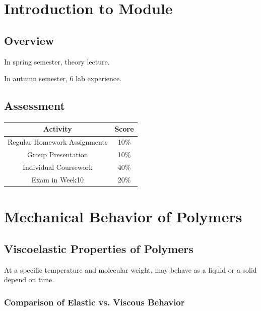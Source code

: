 \documentclass{NoteThesis/note-thesis}
\begin{document}
\maketitle

\tableofcontents

\newpage

\section{Introduction to Module}

\subsection*{Overview}

In spring semester, theory lecture.

In autumn semester, 6 lab experience.

\subsection*{Assessment}

\begin{table}[h]
    \centering
    \begin{tabular}{cc}
        \hline
        Activity & Score\\
        \hline
        Regular Homework Assignments & 10\%\\
        Group Presentation & 10\%\\
        Individual Coursework & 40\%\\
        Exam in Week10 & 20\%\\ 
        \hline
    \end{tabular}
\end{table}

\section{Mechanical Behavior of Polymers}

\subsection{Viscoelastic Properties of Polymers}

At a specific temperature and molecular weight, may behave as a liquid or a solid depend on time.

\subsubsection*{Comparison of Elastic vs. Viscous Behavior}
\end{document}
